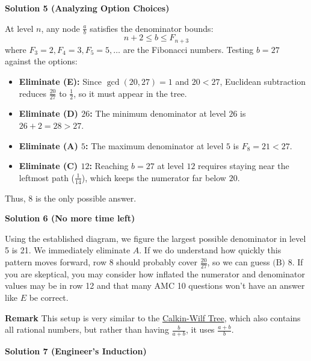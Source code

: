 \begin{enumerate}
 



\textbf{Solution 5 (Analyzing Option Choices)}

At level $n$, any node $\frac{a}{b}$ satisfies the denominator bounds:
 \[n + 2 \leq b \leq F_{n+3}\]where $F_3 = 2, F_4 = 3, F_5 = 5, \dots$ are the Fibonacci numbers. Testing $b = 27$ against the options:

 
            \begin{itemize}
        \item \textbf{Eliminate (E):} Since $\gcd(20, 27) = 1$ and $20 < 27$, Euclidean subtraction reduces $\frac{20}{27}$ to $\frac{1}{2}$, so it must appear in the tree.
        \item \textbf{Eliminate (D) $26$:} The minimum denominator at level $26$ is $26 + 2 = 28 > 27$.
        \item \textbf{Eliminate (A) $5$:} The maximum denominator at level $5$ is $F_8 = 21 < 27$.
        \item \textbf{Eliminate (C) $12$:} Reaching $b = 27$ at level $12$ requires staying near the leftmost path ($\frac{1}{14}$), which keeps the numerator far below $20$.
            \end{itemize}
            Thus, $\boxed{8}$ is the only possible answer.

 



\textbf{Solution 6 (No more time left)}

Using the established diagram, we figure the largest possible denominator in level 5 is 21. We immediately eliminate $A$. If we do understand how quickly this pattern moves forward, row 8 should probably cover $\frac{20}{27}$, so we can guess $\boxed{\text{(B) 8}}$. If you are skeptical, you may consider how inflated the numerator and denominator values may be in row 12 and that many AMC 10 questions won't have an answer like $E$ be correct.

 \textbf{Remark} This setup is very similar to the \href{https://en.wikipedia.org/wiki/Calkin\%E2\%80\%93Wilf\_tree}{Calkin-Wilf Tree}, which also contains all rational numbers, but rather than having $\frac{b}{a+b}$, it uses $\frac{a+b}{b}$.

 



\textbf{Solution 7 (Engineer's Induction)}


\end{enumerate}
